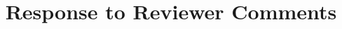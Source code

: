 \documentclass[10pt,letterpaper]{report}
\begin{document}
\doublespacing

\title{Response to Reviewer Comments}


\end{document}
